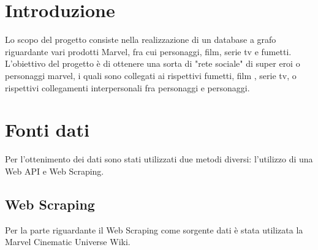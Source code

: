 \documentclass[
10pt, %
a4paper, %
oneside, %
headinclude,footinclude, %
BCOR5mm, %
]{scrartcl}
\begin{document}

\newpage %


\section{Introduzione}
Lo scopo del progetto consiste nella realizzazione di un database a grafo riguardante vari prodotti Marvel, fra cui personaggi, film, serie tv e fumetti.
L'obiettivo del progetto è di ottenere una sorta di "rete sociale" di super eroi o personaggi marvel, i quali sono collegati ai rispettivi fumetti, film , serie tv, o rispettivi collegamenti interpersonali fra personaggi e personaggi.
 

\section{Fonti dati}
Per l'ottenimento dei dati sono stati utilizzati due metodi diversi: l'utilizzo di una Web API e Web Scraping.

\subsection{Web Scraping}
Per la parte riguardante il Web Scraping come sorgente dati è stata utilizata la Marvel Cinematic Universe Wiki.
\end{document}
